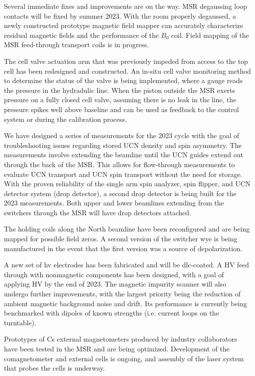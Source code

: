 Several immediate fixes and improvements are on the way. MSR degaussing loop contacts will be fixed by summer 2023. With the room properly degaussed, a newly constructed prototype magnetic field mapper can accurately characterize residual magnetic fields and the performance of the $B_0$ coil. Field mapping of the MSR feed-through transport coils is in progress. 

The cell valve actuation arm that was previously impeded from access to the top cell has been redesigned and constructed. An in-situ cell valve monitoring method to determine the status of the valve is being implemented, where a gauge reads the pressure in the hydradulic line. When the piston outside the MSR exerts pressure on a fully closed cell valve, assuming there is no leak in the line, the pressure spikes well above baseline and can be used as feedback to the control system or during the calibration process.

We have designed a series of measurements for the 2023 cycle with the goal of troubleshooting issues regarding stored UCN density and spin asymmetry. The measurements involve extending the beamline until the UCN guides extend out through the back of the MSR. This allows for flow-through measurements to evaluate UCN transport and UCN spin transport without the need for storage. With the proven reliability of the single arm spin analyzer, spin flipper, and UCN detector system (drop detector), a second drop detector is being built for the 2023 measurements. Both upper and lower beamlines extending from the switchers through the MSR will have drop detectors attached. 

The holding coils along the North beamline have been reconfigured and are being mapped for possible field zeros. A second version of the switcher wye is being manufactured in the event that the first version was a source of depolarization.

A new set of \acrshort{hv} electrodes has been fabricated and will be \acrshort{dlc}-coated. A HV feed through with nonmagnetic components has been designed, with a goal of applying HV by the end of 2023. The magnetic impurity scanner will also undergo further improvements, with the largest priority being the reduction of ambient magnetic background noise and drift. Its performance is currently being benchmarked with dipoles of known strengths (i.e. current loops on the turntable).

Prototypes of Cs external magnetometers produced by industry collaborators have been tested in the MSR and are being optimized. Development of the \hg comagnetometer and external \hg cells is ongoing, and assembly of the laser system that probes the \hg cells is underway.
